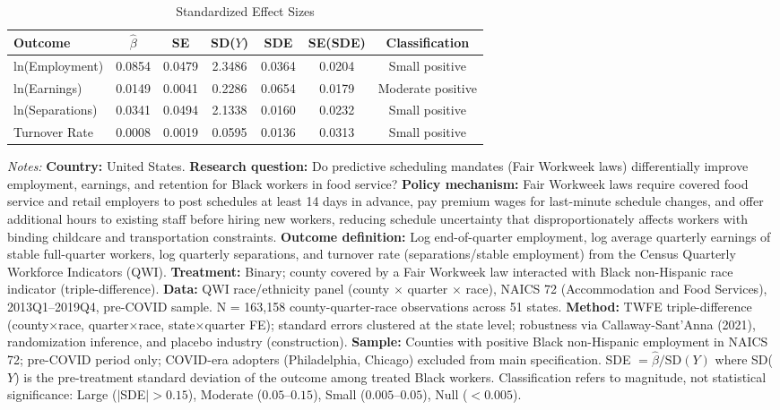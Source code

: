 \begin{table}[htbp]
\centering
\caption{Standardized Effect Sizes}
\label{tab:sde}
\begin{tabular}{lcccccc}
\hline\hline
Outcome & $\hat{\beta}$ & SE & SD($Y$) & SDE & SE(SDE) & Classification \\
\hline
ln(Employment) & 0.0854 & 0.0479 & 2.3486 & 0.0364 & 0.0204 & Small positive \\
ln(Earnings) & 0.0149 & 0.0041 & 0.2286 & 0.0654 & 0.0179 & Moderate positive \\
ln(Separations) & 0.0341 & 0.0494 & 2.1338 & 0.0160 & 0.0232 & Small positive \\
Turnover Rate & 0.0008 & 0.0019 & 0.0595 & 0.0136 & 0.0313 & Small positive \\
\hline\hline
\end{tabular}
\begin{tablenotes}
\small
\item \textit{Notes:} \textbf{Country:} United States. \textbf{Research question:} Do predictive scheduling mandates (Fair Workweek laws) differentially improve employment, earnings, and retention for Black workers in food service? \textbf{Policy mechanism:} Fair Workweek laws require covered food service and retail employers to post schedules at least 14 days in advance, pay premium wages for last-minute schedule changes, and offer additional hours to existing staff before hiring new workers, reducing schedule uncertainty that disproportionately affects workers with binding childcare and transportation constraints. \textbf{Outcome definition:} Log end-of-quarter employment, log average quarterly earnings of stable full-quarter workers, log quarterly separations, and turnover rate (separations/stable employment) from the Census Quarterly Workforce Indicators (QWI). \textbf{Treatment:} Binary; county covered by a Fair Workweek law interacted with Black non-Hispanic race indicator (triple-difference). \textbf{Data:} QWI race/ethnicity panel (county $\times$ quarter $\times$ race), NAICS 72 (Accommodation and Food Services), 2013Q1--2019Q4, pre-COVID sample. N = 163,158 county-quarter-race observations across 51 states. \textbf{Method:} TWFE triple-difference (county$\times$race, quarter$\times$race, state$\times$quarter FE); standard errors clustered at the state level; robustness via Callaway-Sant'Anna (2021), randomization inference, and placebo industry (construction). \textbf{Sample:} Counties with positive Black non-Hispanic employment in NAICS 72; pre-COVID period only; COVID-era adopters (Philadelphia, Chicago) excluded from main specification. SDE $= \hat{\beta} / \text{SD}(Y)$ where SD($Y$) is the pre-treatment standard deviation of the outcome among treated Black workers. Classification refers to magnitude, not statistical significance: Large ($|$SDE$| > 0.15$), Moderate ($0.05$--$0.15$), Small ($0.005$--$0.05$), Null ($< 0.005$).
\end{tablenotes}
\end{table}

